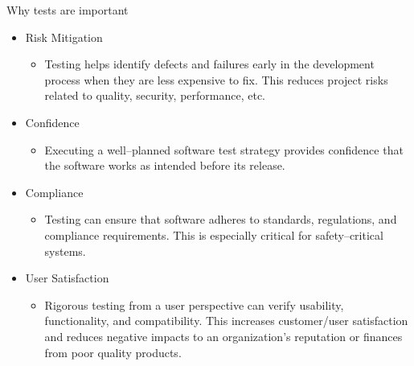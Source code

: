 \begin{frame}{Why tests are important}
\protect{}\label{why-tests-are-important}
\begin{itemize}
\tightlist
\item
  Risk Mitigation

  \begin{itemize}
  \tightlist
  \item
    Testing helps identify defects and failures early in the development
    process when they are less expensive to fix. This reduces project
    risks related to quality, security, performance, etc.
  \end{itemize}
\item
  Confidence

  \begin{itemize}
  \tightlist
  \item
    Executing a well--planned software test strategy provides confidence
    that the software works as intended before its release.
  \end{itemize}
\item
  Compliance

  \begin{itemize}
  \tightlist
  \item
    Testing can ensure that software adheres to standards, regulations,
    and compliance requirements. This is especially critical for
    safety--critical systems.
  \end{itemize}
\item
  User Satisfaction

  \begin{itemize}
  \tightlist
  \item
    Rigorous testing from a user perspective can verify usability,
    functionality, and compatibility. This increases customer/user
    satisfaction and reduces negative impacts to an organization's
    reputation or finances from poor quality products.
  \end{itemize}
\end{itemize}
\end{frame}

